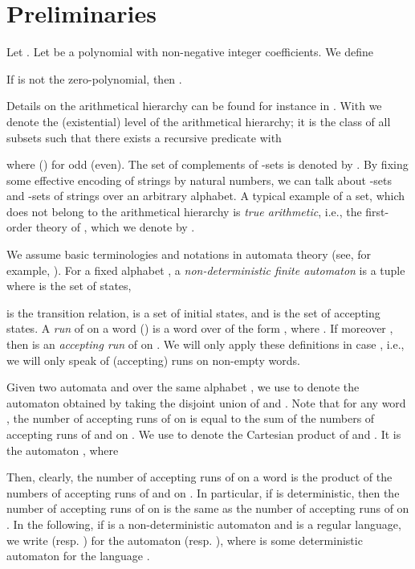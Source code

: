 \documentclass[envcountsame]{llncs}
\begin{document}
\section{Preliminaries} \label{sec:prelim}

Let . Let 
be a polynomial with non-negative integer coefficients.
We define

If  is not the zero-polynomial, then .

Details on the arithmetical hierarchy can be found for instance
in \cite{Rogers}. With  we denote the 
(existential) level of the arithmetical hierarchy; it is the class
of all subsets  such that
there exists a recursive predicate 
with

where  () for  odd (even).
The set of complements of -sets is denoted
by . By fixing some effective encoding of strings
by natural numbers, we can talk about -sets and 
-sets of strings over an arbitrary alphabet.
A typical example of a set, which does not belong
to the arithmetical hierarchy is {\em true arithmetic}, i.e., 
the first-order theory of , which we denote 
by . 

We assume basic terminologies and notations in automata theory 
(see, for example, \cite{HoUl79}).
For a fixed alphabet , a {\em non-deterministic finite automaton} is a
tuple  where  is the set of states,

is the transition relation, 
is a set of initial states, and  is the set of accepting states.
A {\em run} of  on a word  ()
is a word over  of the form ,
where . If moreover , then   is an {\em accepting run} of  on .
We will only apply these definitions in case , i.e., we will only speak of (accepting)
runs on non-empty words.

Given two automata  and  over the same alphabet 
, we use  to denote the automaton obtained 
by taking the disjoint union of  and . Note that for any word , the number of 
accepting runs of  on  is equal to the sum of the numbers of accepting runs of  and   on .
We use  to denote the Cartesian product of  and .
It is the automaton , where

Then, clearly, the number of accepting runs of  on a word 
 is the product of the numbers of accepting runs 
of  and   on .
In particular, if  is deterministic, then 
the number of accepting runs of 
 on  is the same as the number of accepting runs of  on .
In the following, if  is a non-deterministic automaton 
and  is a regular language, we write
 (resp. )
for the automaton  (resp. ), where 
 is some deterministic automaton for the language .
\end{document}

